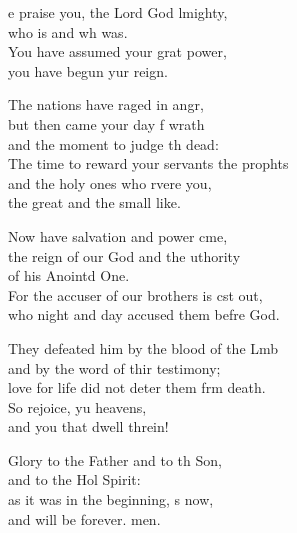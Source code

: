 \settowidth{\versewidth}{The time to reward your servants the prophets +}
\begin{psalmverse}%
  \begin{patverse}
e praise you, the Lord God lmighty,\Med\\
who is and wh was.\\
You have assumed your grat power,\Med\\
you have begun yur reign.

The nations have raged in angr,\Flex\\
but then came your day f wrath\Med\\
and the moment to judge th dead:\\
The time to reward your servants the prophts\Flex\\
and the holy ones who rvere you,\Med\\
the great and the small like.

Now have salvation and power cme,\Flex\\
the reign of our God and the uthority\Med\\
of his Anointd One.\\
For the accuser of our brothers is cst out,\Med\\
who night and day accused them befre God.

They defeated him by the blood of the Lmb\Flex\\
and by the word of thir testimony;\Med\\
love for life did not deter them frm death.\\
So rejoice, yu heavens,\Med\\
and you that dwell threin!

Glory to the Father and to th Son,\Med\\
and to the Hol Spirit:\\
as it was in the beginning, s now,\Med\\
and will be forever. men. 
  \end{patverse}
\end{psalmverse}
